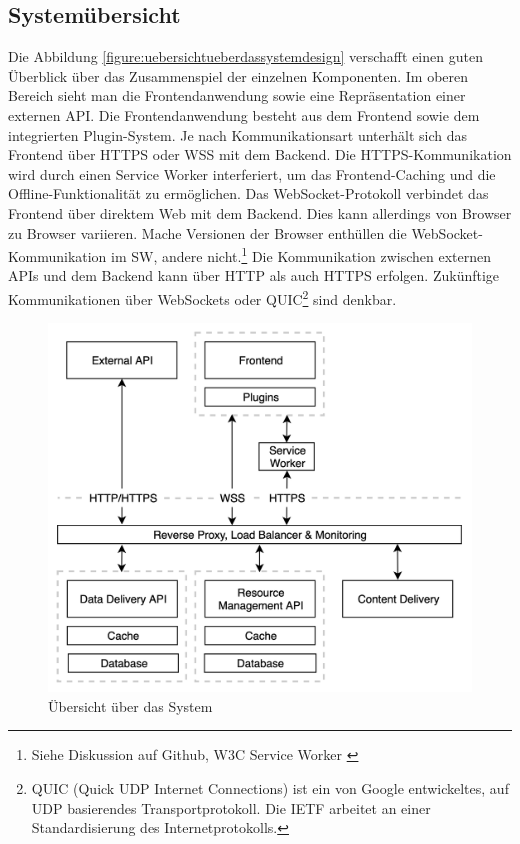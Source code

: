 \subsection{Systemübersicht}
\label{subsec:systemuebersicht}
Die Abbildung \ref{figure:uebersichtueberdassystemdesign} verschafft einen guten Überblick
über das Zusammenspiel der einzelnen Komponenten. Im oberen Bereich sieht man die
Frontendanwendung sowie eine Repräsentation einer externen API. Die Frontendanwendung
besteht aus dem Frontend sowie dem integrierten Plugin-System. Je nach Kommunikationsart
unterhält sich das Frontend über HTTPS oder WSS mit dem Backend. Die HTTPS-Kommunikation
wird durch einen Service Worker interferiert, um das Frontend-Caching und die
Offline-Funktionalität zu ermöglichen. Das WebSocket-Protokoll verbindet das Frontend
über direktem Web mit dem Backend. Dies kann allerdings von Browser zu Browser variieren.
Mache Versionen der Browser enthüllen die WebSocket-Kommunikation im SW, andere
nicht.\footnote{Siehe Diskussion auf Github, W3C Service Worker \cite{GithubIssueWebSocketExpose}}
Die Kommunikation zwischen externen APIs und dem Backend kann über HTTP als auch
HTTPS erfolgen. Zukünftige Kommunikationen über WebSockets oder QUIC\footnote{QUIC (Quick UDP Internet Connections) ist ein von Google entwickeltes, auf UDP basierendes Transportprotokoll.\cite{IETFQUICWhatsHappening} Die IETF arbeitet an einer Standardisierung des Internetprotokolls.\cite{DatatrakcerIETFQuic}}
sind denkbar.

\begin{figure}
    \begin{center}
    \includegraphics[scale=0.2]{img/abbildungen/MicroserviceInfrastruktur}
    \end{center}
    \caption{Übersicht über das System}
    \label{figure:uebersichtueberdassystem}
\end{figure}

